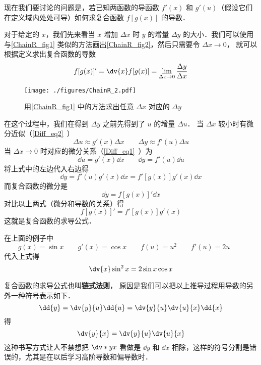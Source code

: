 现在我们要讨论的问题是，若已知两函数的导函数 $f'(x)$ 和 $g'(u)$（假设它们在定义域内处处可导）如何求复合函数 $f[g(x)]$ 的导数．

对于给定的 $x$，我们先来看当 $x$ 增加 $\Delta x$ 时 $y$ 的增量 $\Delta y$ 的大小．我们可以使用与\autoref{ChainR_fig1} 类似的方法画出\autoref{ChainR_fig2}，然后只需要令 $\Delta x \to 0$， 就可以根据定义求出复合函数的导数
\begin{equation}
f[g(x)]' = \dv{x} f[g(x)] = \lim_{\Delta x\to 0} \frac{\Delta y}{\Delta x}
\end{equation}

\begin{figure}[ht]
\centering
\texttt{[image: ./figures/ChainR\_2.pdf]}
\caption{用\autoref{ChainR_fig1} 中的方法求出任意 $\Delta x$ 对应的 $\Delta y$} \label{ChainR_fig2}
\end{figure}

在这个过程中，我们在得到 $\Delta y$ 之前先得到了 $u$ 的增量 $\Delta u$． 当 $\Delta x$ 较小时有微分近似（\autoref{Diff_eq2}~）
\begin{equation}
\Delta {u} \approx g'(x) \Delta{x}
\qquad
\Delta{y} \approx f'(u) \Delta{u}
\end{equation}
当 $\Delta x \to 0$ 时对应的微分关系（\autoref{Diff_eq1}~）为
\begin{equation}
\dd{u} = g'(x) \dd{x}
\qquad
\dd{y} = f'(u) \dd{u}
\end{equation}
将上式中的左边代入右边得
\begin{equation}
\dd{y} = f'(u) g'(x) \dd{x} = f'[g(x)]g'(x) \dd{x}
\end{equation}
而复合函数的微分是
\begin{equation}
\dd{y} = f[g(x)]' \dd{x}
\end{equation}
对比以上两式（微分和导数的关系）得
\begin{equation}\label{ChainR_eq4}
f[g(x)]' = f'[g(x)]g'(x)
\end{equation}
这就是复合函数的求导公式．

在上面的例子中 
\begin{equation}
g(x) = \sin x \qquad
g'(x) = \cos x \qquad %
f(u) = u^2 \qquad
f'(u) = 2u \qquad
\end{equation}
代入上式得
\begin{equation}
\dv{x} \sin^2 x = 2\sin x \cos x
\end{equation}

复合函数的求导公式也叫\textbf{链式法则}， 原因是我们可以把以上推导过程用导数的另外一种符号表示如下．
\begin{equation}
\dd{y} = \dv{y}{u} \dd{u} = \dv{y}{u} \dv{u}{x} \dd{x}
\end{equation}
得
\begin{equation}
\dv{y}{x} = \dv{y}{u} \dv{u}{x}
\end{equation}
这种书写方式让人不禁想把 $\dv*{y}{x}$ 看做是 $\dd{y}$ 和 $\dd{x}$ 相除，这样的符号分割是错误的，尤其是在以后学习高阶导数和偏导数时．%

